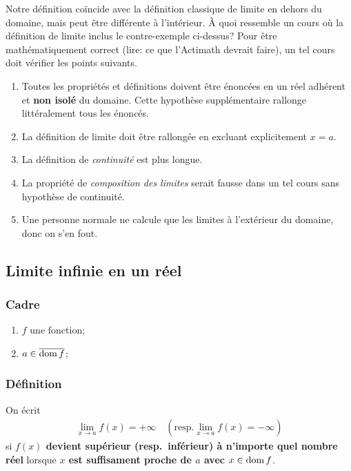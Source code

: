 \documentclass[main.tex]{subfiles}
\begin{document}
\begin{remark}

    Notre définition coïncide avec la définition classique de limite en dehors du domaine,
    mais peut être différente à l'intérieur.
    À quoi ressemble un cours où la définition de limite inclus le contre-exemple ci-dessus?
    Pour être mathématiquement correct
    (lire: ce que l'Actimath devrait faire),
    un tel cours doit vérifier les points suivants.
    \begin{enumerate}
        \item Toutes les propriétés et définitions doivent être énoncées
            en un réel adhérent et \textbf{non isolé} du domaine.
            Cette hypothèse supplémentaire rallonge littéralement tous les énoncés.
        \item La définition de limite doit être rallongée en excluant explicitement $x = a$.
        \item La définition de \emph{continuité} est plus longue.
        \item La propriété de \emph{composition des limites} serait fausse dans un tel cours sans hypothèse de continuité.
        \item Une personne normale ne calcule que les limites à l'extérieur du domaine, donc on s'en fout.
    \end{enumerate}
\end{remark}

\subsection{Limite infinie en un réel}

\begin{definition}

    \subsubsection*{Cadre}
    \begin{enumerate}
        \item $f$ une fonction;
        \item $a \in \overline{\operatorname{dom} f}$;
    \end{enumerate}

    \subsubsection*{Définition}
    On écrit
    \begin{align}
        \lim_{x \to a} f(x) = +\infty \quad
        \left(\text{resp.} \lim_{x \to a} f(x) = -\infty\right)
    \end{align}
    si \textbf{$f(x)$ devient supérieur (resp.\ inférieur) à n'importe quel nombre réel}
    lorsque \textbf{$x$ est suffisament proche de $a$ avec $x \in \operatorname{dom} f$}.
\end{definition}
\end{document}
